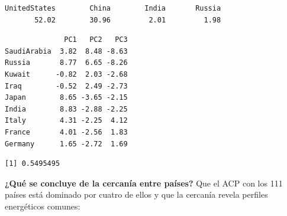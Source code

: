 \documentclass[oneside, openany, fontset=libertinus]{mitthesis}
\newenvironment{Shaded}{\begin{snugshade}}{\end{snugshade}}
\newcommand{\DecValTok}[1]{\textcolor[rgb]{0.68,0.00,0.00}{#1}}
\newcommand{\FunctionTok}[1]{\textcolor[rgb]{0.28,0.35,0.67}{#1}}
\newcommand{\NormalTok}[1]{\textcolor[rgb]{0.00,0.23,0.31}{#1}}
\newcommand{\SpecialCharTok}[1]{\textcolor[rgb]{0.37,0.37,0.37}{#1}}
\newcommand{\StringTok}[1]{\textcolor[rgb]{0.13,0.47,0.30}{#1}}
\newenvironment{codres}%
  {\par\smallskip\noindent\begin{minipage}[t]{0.57\linewidth}\vspace{0pt}}%
  {\end{minipage}\par\medskip}
\newcommand{\codressep}{\end{minipage}\hfill\begin{minipage}[t]{0.40\linewidth}\vspace{0pt}}
\begin{document}
\begin{verbatim}
UnitedStates        China        India       Russia 
       52.02        30.96         2.01         1.98 
\end{verbatim}

\Needspace{2.47in}

\begin{Shaded}
\end{Shaded}

\begin{verbatim}
              PC1   PC2   PC3
SaudiArabia  3.82  8.48 -8.63
Russia       8.77  6.65 -8.26
Kuwait      -0.82  2.03 -2.68
Iraq        -0.52  2.49 -2.73
Japan        8.65 -3.65 -2.15
India        8.83 -2.88 -2.25
Italy        4.31 -2.25  4.12
France       4.01 -2.56  1.83
Germany      1.65 -2.72  1.69
\end{verbatim}

\Needspace{1.14in}

\begin{codres}

\begin{Shaded}
\end{Shaded}

\codressep

\begin{verbatim}
[1] 0.5495495
\end{verbatim}

\end{codres}

\textbf{¿Qué se concluye de la cercanía entre países?} Que el ACP con
los 111 países está dominado por cuatro de ellos y que la cercanía
revela perfiles energéticos comunes:
\end{document}
